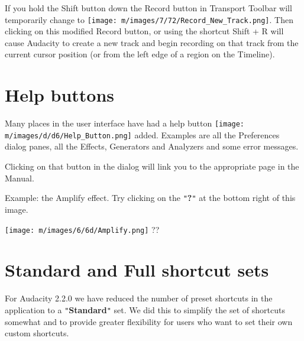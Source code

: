 If you hold the 
Shift
 button down the Record button in Transport Toolbar will temporarily change to \texttt{[image: m/images/7/72/Record\_New\_Track.png]}. Then clicking on this modified Record button, or using the shortcut 
Shift + R
 will cause Audacity to create a new track and begin recording on that track from the current cursor position (or from the left edge of a region on the Timeline). 




\section{
Help buttons
}


Many places in the user interface have had a help button \texttt{[image: m/images/d/d6/Help\_Button.png]} added. Examples are all the Preferences dialog panes, all the Effects, Generators and Analyzers and some error messages.

Clicking on that button in the dialog will link you to the appropriate page in the Manual.


Example:
 the Amplify effect.  Try clicking on the \texttt{{}"{}}\textbf{?}\texttt{{}"{}} at the bottom right of this image.



\texttt{[image: m/images/6/6d/Amplify.png]}
??




\section{
Standard and Full shortcut sets
}


For Audacity 2.2.0 we have reduced the number of preset shortcuts in the application to a \texttt{{}"{}}\textbf{Standard}\texttt{{}"{}} set.  We did this to simplify the set of shortcuts somewhat and to provide greater flexibility for users who want to set their own custom shortcuts.


